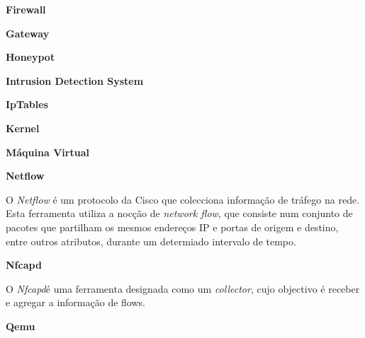 \begin{description}
    \item \textbf{Firewall}
\end{description}

\begin{description}
    \item \textbf{Gateway}
\end{description}

\begin{description}
    \item \textbf{Honeypot}
\end{description}

\begin{description}
    \item \textbf{Intrusion Detection System}
\end{description}

\begin{description}
    \item \textbf{IpTables}
\end{description}

\begin{description}
    \item \textbf{Kernel}
\end{description}

\begin{description}
    \item \textbf{Máquina Virtual}
\end{description}

\begin{description}
    \item \textbf{Netflow}

O \textit{Netflow} é um protocolo da Cisco que colecciona informação de tráfego na rede. Esta ferramenta utiliza a nocção de \textit{network flow}, que consiste num conjunto de pacotes que partilham os mesmos endereços IP e portas de origem e destino, entre outros atributos, durante um determiado intervalo de tempo. 
\end{description}

\begin{description}
    \item \textbf{Nfcapd}

O \textit{Nfcapd}é uma ferramenta designada como um \textit{collector}, cujo objectivo é receber e agregar a informação de flows.
\end{description}

\begin{description}
    \item \textbf{Qemu}
\end{description}

